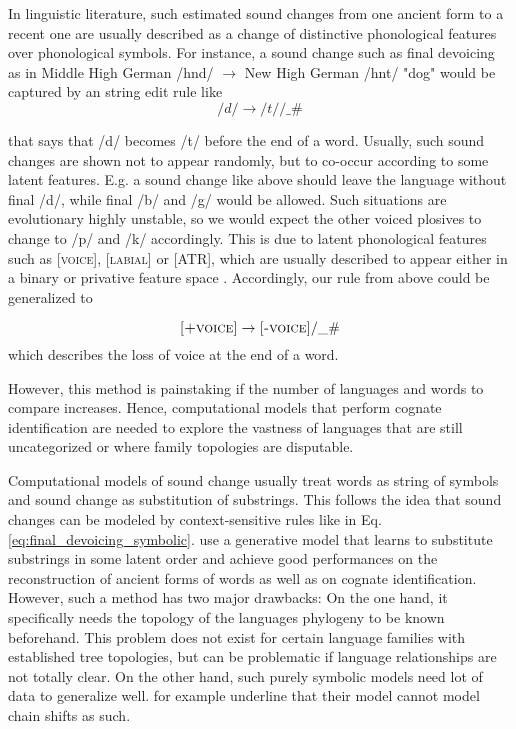 \documentclass[6pt]{article}
\begin{document}
In linguistic literature, such estimated sound changes from one ancient form to a recent one are usually described as a change of distinctive phonological features over phonological symbols. For instance, a sound change such as final devoicing as in Middle High German /hnd/ $\rightarrow$ New High German /hnt/ "dog" would be captured by an string edit rule like
\begin{equation}
/d/ \rightarrow /t/ / \_ \#
\label{eq:final_devoicing_symbolic}
\end{equation}

that says that /d/ becomes /t/ before the end of a word. Usually, such sound changes are shown not to appear randomly, but to co-occur according to some latent features. E.g. a sound change like above should leave the language without final /d/, while final /b/ and /g/ would be allowed. Such situations are evolutionary highly unstable, so we would expect the other voiced plosives to change to /p/ and /k/ accordingly. This is due to latent phonological features such as \textsc{[voice]}, \textsc{[labial]} or \textsc{[ATR]}, which are usually described to appear either in a binary or privative feature space \citep{chomsky1968sound}. Accordingly, our rule from above could be generalized to

\begin{equation}
\textsc{[+voice]} \rightarrow \textsc{[-voice]} / \_ \#
\label{eq:final_devoicing}
\end{equation}
which describes the loss of voice at the end of a word.

However, this method is painstaking if the number of languages and words to compare increases. Hence, computational models that perform cognate identification are needed to explore the vastness of languages that are still uncategorized or where family topologies are disputable.

Computational models of sound change usually treat words as string of symbols and sound change as substitution of substrings. This follows the idea that sound changes can be modeled by context-sensitive rules like in Eq. \ref{eq:final_devoicing_symbolic}. \cite{bouchard2007probabilistic,bouchard2013automated} use a generative model that learns to substitute substrings in some latent order and achieve good performances on the reconstruction of ancient forms of words as well as on cognate identification. However, such a method has two major drawbacks: On the one hand, it specifically needs the topology of the languages phylogeny to be known beforehand. This problem does not exist for certain language families with established tree topologies, but can be problematic if language relationships are not totally clear. On the other hand, such purely symbolic models need lot of data to generalize well. \cite{bouchard2007probabilistic} for example underline that their model cannot model chain shifts as such.
\end{document}
